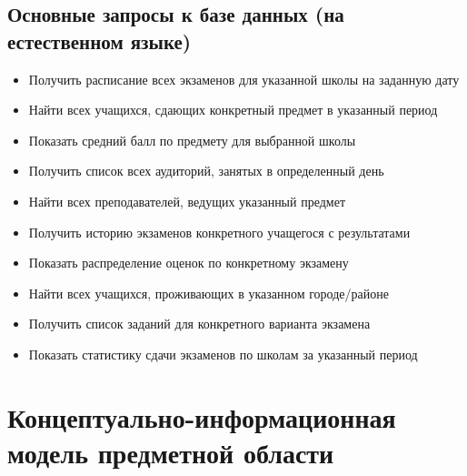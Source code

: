 \documentclass[a4paper]{article}
\begin{document}
\subsection{Основные запросы к базе данных (на естественном языке)}
\begin{itemize}
      \item Получить расписание всех экзаменов для указанной школы на заданную дату
      \item Найти всех учащихся, сдающих конкретный предмет в указанный период
      \item Показать средний балл по предмету для выбранной школы
      \item Получить список всех аудиторий, занятых в определенный день
      \item Найти всех преподавателей, ведущих указанный предмет
      \item Получить историю экзаменов конкретного учащегося с результатами
      \item Показать распределение оценок по конкретному экзамену
      \item Найти всех учащихся, проживающих в указанном городе/районе
      \item Получить список заданий для конкретного варианта экзамена
      \item Показать статистику сдачи экзаменов по школам за указанный период
\end{itemize}

\section{Концептуально-информационная модель предметной области}
\end{document}
